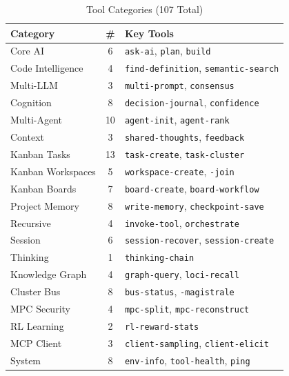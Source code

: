 \documentclass[journal,10pt]{IEEEtran}
\newcommand{\code}[1]{\texttt{#1}}
\begin{document}
\begin{table}[!t]
\centering
\caption{Tool Categories (107 Total)}
\label{tab:tools}
\renewcommand{\arraystretch}{0.95}
\begin{tabular}{@{}lcp{28mm}@{}}
\toprule
\textbf{Category} & \textbf{\#} & \textbf{Key Tools} \\
\midrule
Core AI           & 6  & \code{ask-ai}, \code{plan}, \code{build} \\
Code Intelligence & 4  & \code{find-definition}, \code{semantic-search} \\
Multi-LLM         & 3  & \code{multi-prompt}, \code{consensus} \\
Cognition         & 8  & \code{decision-journal}, \code{confidence} \\
Multi-Agent       & 10 & \code{agent-init}, \code{agent-rank} \\
Context           & 3  & \code{shared-thoughts}, \code{feedback} \\
Kanban Tasks      & 13 & \code{task-create}, \code{task-cluster} \\
Kanban Workspaces & 5  & \code{workspace-create}, \code{-join} \\
Kanban Boards     & 7  & \code{board-create}, \code{board-workflow} \\
Project Memory    & 8  & \code{write-memory}, \code{checkpoint-save} \\
Recursive         & 4  & \code{invoke-tool}, \code{orchestrate} \\
Session           & 6  & \code{session-recover}, \code{session-create} \\
Thinking          & 1  & \code{thinking-chain} \\
Knowledge Graph   & 4  & \code{graph-query}, \code{loci-recall} \\
Cluster Bus       & 8  & \code{bus-status}, \code{-magistrale} \\
MPC Security      & 4  & \code{mpc-split}, \code{mpc-reconstruct} \\
RL Learning       & 2  & \code{rl-reward-stats} \\
MCP Client        & 3  & \code{client-sampling}, \code{client-elicit} \\
System            & 8  & \code{env-info}, \code{tool-health}, \code{ping} \\
\bottomrule
\end{tabular}
\end{table}

\end{document}
